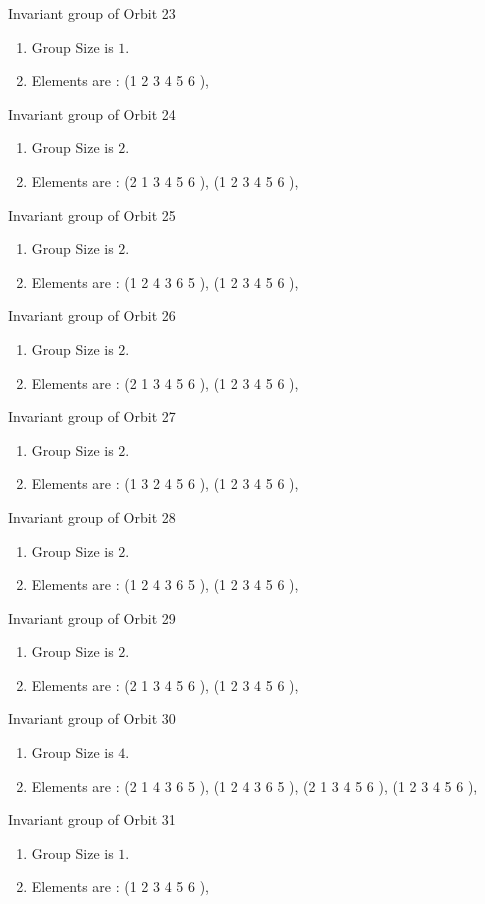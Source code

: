 \documentclass[12pt]{article}
\begin{document}
Invariant group of Orbit 23
\begin{enumerate}
\item Group Size is $1$.
\item Elements are : (1 2 3 4 5 6  ), 
\end{enumerate}
Invariant group of Orbit 24
\begin{enumerate}
\item Group Size is $2$.
\item Elements are : (2 1 3 4 5 6  ), (1 2 3 4 5 6  ), 
\end{enumerate}
Invariant group of Orbit 25
\begin{enumerate}
\item Group Size is $2$.
\item Elements are : (1 2 4 3 6 5  ), (1 2 3 4 5 6  ), 
\end{enumerate}
Invariant group of Orbit 26
\begin{enumerate}
\item Group Size is $2$.
\item Elements are : (2 1 3 4 5 6  ), (1 2 3 4 5 6  ), 
\end{enumerate}
Invariant group of Orbit 27
\begin{enumerate}
\item Group Size is $2$.
\item Elements are : (1 3 2 4 5 6  ), (1 2 3 4 5 6  ), 
\end{enumerate}
Invariant group of Orbit 28
\begin{enumerate}
\item Group Size is $2$.
\item Elements are : (1 2 4 3 6 5  ), (1 2 3 4 5 6  ), 
\end{enumerate}
Invariant group of Orbit 29
\begin{enumerate}
\item Group Size is $2$.
\item Elements are : (2 1 3 4 5 6  ), (1 2 3 4 5 6  ), 
\end{enumerate}
Invariant group of Orbit 30
\begin{enumerate}
\item Group Size is $4$.
\item Elements are : (2 1 4 3 6 5  ), (1 2 4 3 6 5  ), (2 1 3 4 5 6  ), (1 2 3 4 5 6  ), 
\end{enumerate}
Invariant group of Orbit 31
\begin{enumerate}
\item Group Size is $1$.
\item Elements are : (1 2 3 4 5 6  ), 
\end{enumerate}
\end{document}
